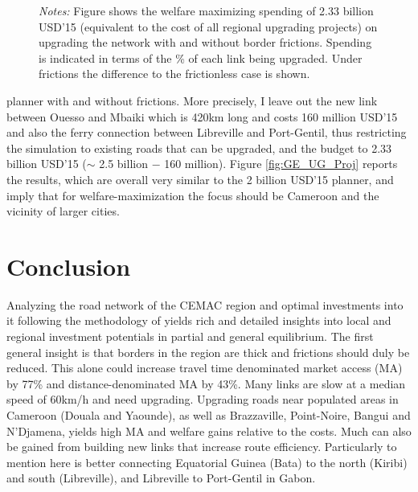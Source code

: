 \documentclass[a4paper]{article}
\begin{document}
\begin{figure}[H]
{\begin{tabular}{cc}
\end{tabular}
}
\scriptsize 
\emph{Notes:} Figure shows the welfare maximizing spending of 2.33 billion USD'15 (equivalent to the cost of all regional upgrading projects) on upgrading the network with and without border frictions. Spending is indicated in terms of the \% of each link being upgraded. Under frictions the difference to the frictionless case is shown.   
 \vspace{-3mm}
\end{figure}

\noindent planner with and without frictions. More precisely, I leave out the new link between Ouesso and Mbaiki which is 420km long and costs 160 million USD'15 and also the ferry connection between Libreville and Port-Gentil, thus restricting the simulation to existing roads that can be upgraded, and the budget to 2.33 billion USD'15 ($\sim$ 2.5 billion $-$ 160 million). Figure \ref{fig:GE_UG_Proj} reports the results, which are overall very similar to the 2 billion USD'15 planner, and imply that for welfare-maximization the focus should be Cameroon and the vicinity of larger cities. 






\section{Conclusion} 

Analyzing the road network of the CEMAC region and optimal investments into it following the methodology of \citet{krantz2024optimal} yields rich and detailed insights into local and regional investment potentials in partial and general equilibrium. The first general insight is that borders in the region are thick and frictions should duly be reduced. This alone could increase travel time denominated market access (MA) by 77\% and distance-denominated MA by 43\%. Many links are slow at a median speed of 60km/h and need upgrading. Upgrading roads near populated areas in Cameroon (Douala and Yaounde), as well as Brazzaville, Point-Noire, Bangui and N'Djamena, yields high MA and welfare gains relative to the costs. Much can also be gained from building new links that increase route efficiency. Particularly to mention here is better connecting Equatorial Guinea (Bata) to the north (Kiribi) and south (Libreville), and Libreville to Port-Gentil in Gabon. \newline 
\end{document}
